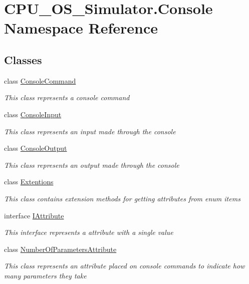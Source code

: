 \hypertarget{namespace_c_p_u___o_s___simulator_1_1_console}{}\section{C\+P\+U\+\_\+\+O\+S\+\_\+\+Simulator.\+Console Namespace Reference}
\label{namespace_c_p_u___o_s___simulator_1_1_console}
\subsection*{Classes}
\begin{DoxyCompactItemize}
\item 
class \hyperlink{class_c_p_u___o_s___simulator_1_1_console_1_1_console_command}{Console\+Command}
\begin{DoxyCompactList}\small\item\em This class represents a console command \end{DoxyCompactList}\item 
class \hyperlink{class_c_p_u___o_s___simulator_1_1_console_1_1_console_input}{Console\+Input}
\begin{DoxyCompactList}\small\item\em This class represents an input made through the console \end{DoxyCompactList}\item 
class \hyperlink{class_c_p_u___o_s___simulator_1_1_console_1_1_console_output}{Console\+Output}
\begin{DoxyCompactList}\small\item\em This class represents an output made through the console \end{DoxyCompactList}\item 
class \hyperlink{class_c_p_u___o_s___simulator_1_1_console_1_1_extentions}{Extentions}
\begin{DoxyCompactList}\small\item\em This class contains extension methods for getting attributes from enum items \end{DoxyCompactList}\item 
interface \hyperlink{interface_c_p_u___o_s___simulator_1_1_console_1_1_i_attribute}{I\+Attribute}
\begin{DoxyCompactList}\small\item\em This interface represents a attribute with a single value \end{DoxyCompactList}\item 
class \hyperlink{class_c_p_u___o_s___simulator_1_1_console_1_1_number_of_parameters_attribute}{Number\+Of\+Parameters\+Attribute}
\begin{DoxyCompactList}\small\item\em This class represents an attribute placed on console commands to indicate how many parameters they take \end{DoxyCompactList}\end{DoxyCompactItemize}
